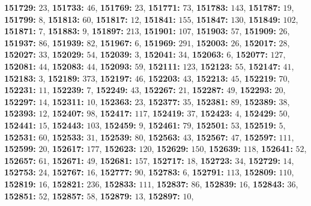 \textsf{\bfseries 151729:} $23$, \textsf{\bfseries 151733:} $46$, \textsf{\bfseries 151769:} $23$, \textsf{\bfseries 151771:} $73$, \textsf{\bfseries 151783:} $143$, \textsf{\bfseries 151787:} $19$, \textsf{\bfseries 151799:} $8$, \textsf{\bfseries 151813:} $60$, \textsf{\bfseries 151817:} $12$, \textsf{\bfseries 151841:} $155$, \textsf{\bfseries 151847:} $130$, \textsf{\bfseries 151849:} $102$, \textsf{\bfseries 151871:} $7$, \textsf{\bfseries 151883:} $9$, \textsf{\bfseries 151897:} $213$, \textsf{\bfseries 151901:} $107$, \textsf{\bfseries 151903:} $57$, \textsf{\bfseries 151909:} $26$, \textsf{\bfseries 151937:} $86$, \textsf{\bfseries 151939:} $82$, \textsf{\bfseries 151967:} $6$, \textsf{\bfseries 151969:} $291$, \textsf{\bfseries 152003:} $26$, \textsf{\bfseries 152017:} $28$, \textsf{\bfseries 152027:} $33$, \textsf{\bfseries 152029:} $54$, \textsf{\bfseries 152039:} $3$, \textsf{\bfseries 152041:} $34$, \textsf{\bfseries 152063:} $6$, \textsf{\bfseries 152077:} $127$, \textsf{\bfseries 152081:} $44$, \textsf{\bfseries 152083:} $44$, \textsf{\bfseries 152093:} $59$, \textsf{\bfseries 152111:} $123$, \textsf{\bfseries 152123:} $55$, \textsf{\bfseries 152147:} $41$, \textsf{\bfseries 152183:} $3$, \textsf{\bfseries 152189:} $373$, \textsf{\bfseries 152197:} $46$, \textsf{\bfseries 152203:} $43$, \textsf{\bfseries 152213:} $45$, \textsf{\bfseries 152219:} $70$, \textsf{\bfseries 152231:} $11$, \textsf{\bfseries 152239:} $7$, \textsf{\bfseries 152249:} $43$, \textsf{\bfseries 152267:} $21$, \textsf{\bfseries 152287:} $49$, \textsf{\bfseries 152293:} $20$, \textsf{\bfseries 152297:} $14$, \textsf{\bfseries 152311:} $10$, \textsf{\bfseries 152363:} $23$, \textsf{\bfseries 152377:} $35$, \textsf{\bfseries 152381:} $89$, \textsf{\bfseries 152389:} $38$, \textsf{\bfseries 152393:} $12$, \textsf{\bfseries 152407:} $98$, \textsf{\bfseries 152417:} $117$, \textsf{\bfseries 152419:} $37$, \textsf{\bfseries 152423:} $4$, \textsf{\bfseries 152429:} $50$, \textsf{\bfseries 152441:} $15$, \textsf{\bfseries 152443:} $103$, \textsf{\bfseries 152459:} $9$, \textsf{\bfseries 152461:} $79$, \textsf{\bfseries 152501:} $53$, \textsf{\bfseries 152519:} $5$, \textsf{\bfseries 152531:} $60$, \textsf{\bfseries 152533:} $31$, \textsf{\bfseries 152539:} $80$, \textsf{\bfseries 152563:} $43$, \textsf{\bfseries 152567:} $47$, \textsf{\bfseries 152597:} $111$, \textsf{\bfseries 152599:} $20$, \textsf{\bfseries 152617:} $177$, \textsf{\bfseries 152623:} $120$, \textsf{\bfseries 152629:} $150$, \textsf{\bfseries 152639:} $118$, \textsf{\bfseries 152641:} $52$, \textsf{\bfseries 152657:} $61$, \textsf{\bfseries 152671:} $49$, \textsf{\bfseries 152681:} $157$, \textsf{\bfseries 152717:} $18$, \textsf{\bfseries 152723:} $34$, \textsf{\bfseries 152729:} $14$, \textsf{\bfseries 152753:} $24$, \textsf{\bfseries 152767:} $16$, \textsf{\bfseries 152777:} $90$, \textsf{\bfseries 152783:} $6$, \textsf{\bfseries 152791:} $113$, \textsf{\bfseries 152809:} $110$, \textsf{\bfseries 152819:} $16$, \textsf{\bfseries 152821:} $236$, \textsf{\bfseries 152833:} $111$, \textsf{\bfseries 152837:} $86$, \textsf{\bfseries 152839:} $16$, \textsf{\bfseries 152843:} $36$, \textsf{\bfseries 152851:} $52$, \textsf{\bfseries 152857:} $58$, \textsf{\bfseries 152879:} $13$, \textsf{\bfseries 152897:} $10$, 
